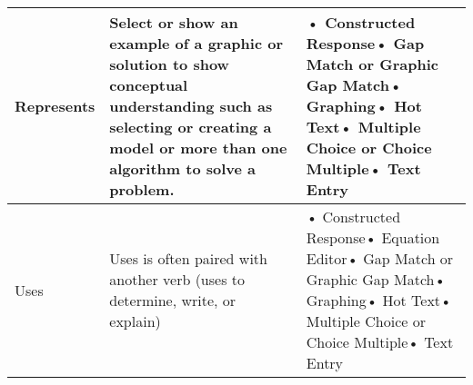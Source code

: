 \documentclass[11pt, English]{article}
\begin{document}
\begin{longtable}{|p{1.8cm}|p{6.0cm}|p{8.7cm}|}
 \hline
	  Represents & Select or show an example of a graphic or solution to show conceptual understanding such as selecting or creating a model or more than one algorithm to solve a problem. & • Constructed Response\newline• Gap Match or Graphic Gap Match\newline• Graphing\newline• Hot Text\newline• Multiple Choice or Choice Multiple\newline• Text Entry\\
 \hline
	  Uses & Uses is often paired with another verb (uses to determine, write, or explain) & • Constructed Response\newline• Equation Editor\newline• Gap Match or Graphic Gap Match\newline• Graphing\newline• Hot Text\newline• Multiple Choice or Choice Multiple\newline• Text Entry\\
 \hline
	 	  \hline



\end{longtable}
\end{document}
